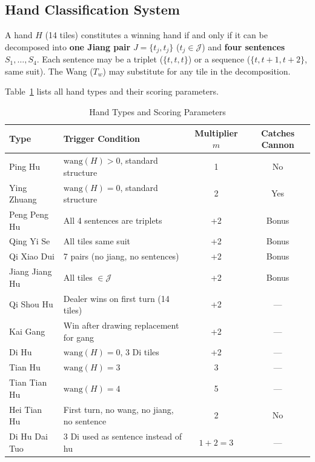 \documentclass[11pt,a4paper]{article}
\begin{document}
\subsection{Hand Classification System}

A hand $H$ (14 tiles) constitutes a winning hand if and only if it can be decomposed into \textbf{one Jiang pair} $J = \{t_j, t_j\}$ ($t_j \in \mathcal{J}$) and \textbf{four sentences} $S_1,\ldots,S_4$. Each sentence may be a triplet ($\{t,t,t\}$) or a sequence ($\{t,t+1,t+2\}$, same suit). The Wang ($T_w$) may substitute for any tile in the decomposition.

Table~\ref{tab:hutype} lists all hand types and their scoring parameters.

\begin{table}[H]
\centering
\caption{Hand Types and Scoring Parameters}
\label{tab:hutype}
\small
\begin{tabular}{@{}llcc@{}}
\toprule
\textbf{Type} & \textbf{Trigger Condition} & \textbf{Multiplier $m$} & \textbf{Catches Cannon} \\
\midrule
Ping Hu        & $\text{wang}(H) > 0$, standard structure & 1 & No \\
Ying Zhuang    & $\text{wang}(H) = 0$, standard structure & 2 & Yes \\
Peng Peng Hu   & All 4 sentences are triplets & +2 & Bonus \\
Qing Yi Se     & All tiles same suit & +2 & Bonus \\
Qi Xiao Dui    & 7 pairs (no jiang, no sentences) & +2 & Bonus \\
Jiang Jiang Hu & All tiles $\in \mathcal{J}$ & +2 & Bonus \\
Qi Shou Hu     & Dealer wins on first turn (14 tiles) & +2 & — \\
Kai Gang       & Win after drawing replacement for gang & +2 & — \\
Di Hu          & $\text{wang}(H)=0$, 3 Di tiles & +2 & — \\
Tian Hu        & $\text{wang}(H)=3$ & 3 & — \\
Tian Tian Hu   & $\text{wang}(H)=4$ & 5 & — \\
Hei Tian Hu    & First turn, no wang, no jiang, no sentence & 2 & No \\
Di Hu Dai Tuo  & 3 Di used as sentence instead of hu & $1+2=3$ & — \\
\bottomrule
\end{tabular}
\end{table}
\end{document}
